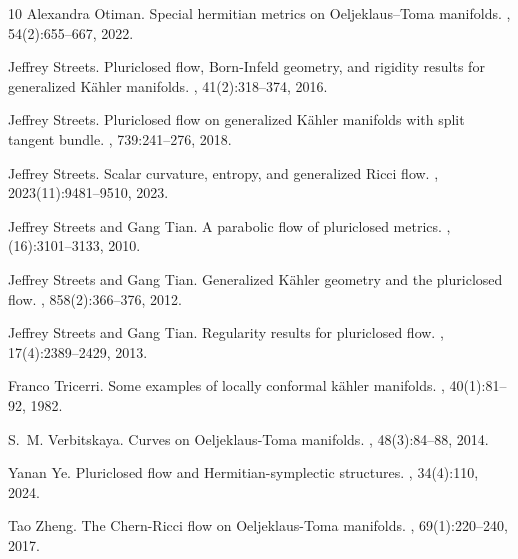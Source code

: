 \documentclass[12pt]{amsart}
\numberwithin{equation}{section}
\numberwithin{prop}{section}
\theoremstyle{definition}
\begin{document}
\begin{thebibliography}{10}
Alexandra Otiman.
\newblock Special hermitian metrics on Oeljeklaus--Toma manifolds.
, 54(2):655--667, 2022.

Jeffrey Streets.
\newblock Pluriclosed flow, {B}orn-{I}nfeld geometry, and rigidity results for generalized {K}\"ahler manifolds.
, 41(2):318--374, 2016.

Jeffrey Streets.
\newblock Pluriclosed flow on generalized {K}\"ahler manifolds with split tangent bundle.
, 739:241--276, 2018.

Jeffrey Streets.
\newblock Scalar curvature, entropy, and generalized Ricci flow.
, 2023(11):9481--9510, 2023.

Jeffrey Streets and Gang Tian.
\newblock A parabolic flow of pluriclosed metrics.
, (16):3101--3133, 2010.

Jeffrey Streets and Gang Tian.
\newblock Generalized {K}\"ahler geometry and the pluriclosed flow.
, 858(2):366--376, 2012.

Jeffrey Streets and Gang Tian.
\newblock Regularity results for pluriclosed flow.
, 17(4):2389--2429, 2013.

Franco Tricerri.
\newblock Some examples of locally conformal k{\"a}hler manifolds.
, 40(1):81--92, 1982.

S.~M. Verbitskaya.
\newblock Curves on {O}eljeklaus-{T}oma manifolds.
, 48(3):84--88, 2014.

Yanan Ye.
\newblock Pluriclosed flow and Hermitian-symplectic structures.
, 34(4):110, 2024.

Tao Zheng.
\newblock The {C}hern-{R}icci flow on {O}eljeklaus-{T}oma manifolds.
, 69(1):220--240, 2017.

\end{thebibliography}
\end{document}
